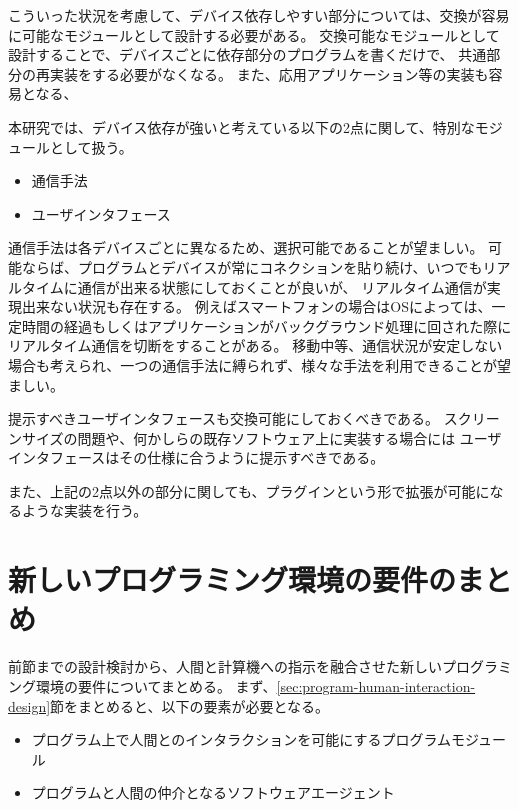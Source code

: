 こういった状況を考慮して、デバイス依存しやすい部分については、交換が容易に可能なモジュールとして設計する必要がある。
交換可能なモジュールとして設計することで、デバイスごとに依存部分のプログラムを書くだけで、
共通部分の再実装をする必要がなくなる。
また、応用アプリケーション等の実装も容易となる、

本研究では、デバイス依存が強いと考えている以下の2点に関して、特別なモジュールとして扱う。

\begin{itemize}
\itemsep1pt\parskip0pt
\item
  通信手法
\item
  ユーザインタフェース
\end{itemize}

通信手法は各デバイスごとに異なるため、選択可能であることが望ましい。
可能ならば、プログラムとデバイスが常にコネクションを貼り続け、いつでもリアルタイムに通信が出来る状態にしておくことが良いが、
リアルタイム通信が実現出来ない状況も存在する。
例えばスマートフォンの場合はOSによっては、一定時間の経過もしくはアプリケーションがバックグラウンド処理に回された際に
リアルタイム通信を切断をすることがある。
移動中等、通信状況が安定しない場合も考えられ、一つの通信手法に縛られず、様々な手法を利用できることが望ましい。

提示すべきユーザインタフェースも交換可能にしておくべきである。
スクリーンサイズの問題や、何かしらの既存ソフトウェア上に実装する場合には
ユーザインタフェースはその仕様に合うように提示すべきである。

また、上記の2点以外の部分に関しても、プラグインという形で拡張が可能になるような実装を行う。

\section{新しいプログラミング環境の要件のまとめ}\label{ux65b0ux3057ux3044ux30d7ux30edux30b0ux30e9ux30dfux30f3ux30b0ux74b0ux5883ux306eux8981ux4ef6ux306eux307eux3068ux3081}

前節までの設計検討から、人間と計算機への指示を融合させた新しいプログラミング環境の要件についてまとめる。
まず、\ref{sec:program-human-interaction-design}節をまとめると、以下の要素が必要となる。

\begin{itemize}
\itemsep1pt\parskip0pt
\item
  プログラム上で人間とのインタラクションを可能にするプログラムモジュール
\item
  プログラムと人間の仲介となるソフトウェアエージェント
\end{itemize}

